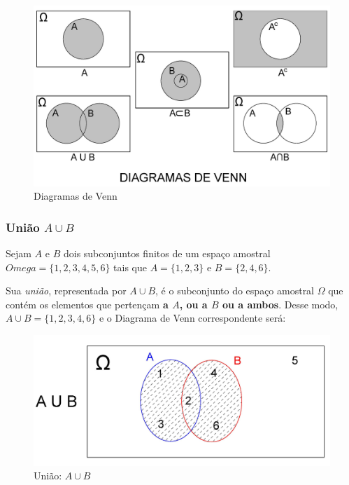 \documentclass[
]{book}
\begin{document}
\begin{figure}

{\centering \includegraphics[width=0.8\linewidth]{images4/venn} 

}

\caption{Diagramas de Venn}\label{fig:unnamed-chunk-62}
\end{figure}

\hfill\break

\hypertarget{uniuxe3o-a-cup-b}{%
\subsubsection{\texorpdfstring{União \(A \cup B\)}{União A \textbackslash cup B}}\label{uniuxe3o-a-cup-b}}

Sejam \(A\) e \(B\) dois subconjuntos finitos de um espaço amostral \(Omega=\{1,2,3,4,5,6\}\) tais que \(A=\{1,2,3\}\) e \(B=\{2,4,6\}\).

Sua \emph{união}, representada por \(A \cup B\), é o subconjunto do espaço amostral \(\Omega\) que contém os elementos que pertençam \textbf{a \(A\), ou a \(B\) ou a ambos}. Desse modo, \(A \cup B =\{1,2,3,4,6\}\) e o Diagrama de Venn correspondente será:

\hfill\break

\begin{figure}

{\centering \includegraphics[width=0.8\linewidth]{images4/A_UN_B} 

}

\caption{União: $A \cup B$}\label{fig:unnamed-chunk-63}
\end{figure}
\end{document}

